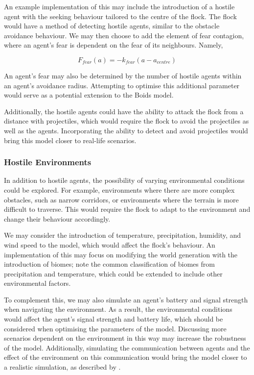 \documentclass[12pt]{article}
\begin{document}
An example implementation of this may include the introduction of a hostile agent with the seeking behaviour tailored to the centre of the flock. The flock would have a method of detecting hostile agents, similar to the obstacle avoidance behaviour. We may then choose to add the element of fear contagion, where an agent's fear is dependent on the fear of its neighbours. Namely,

\begin{equation}
    F_{fear}(a) = -k_{fear}(a-a_{centre})
\end{equation}

An agent's fear may also be determined by the number of hostile agents within an agent's avoidance radius. Attempting to optimise this additional parameter would serve as a potential extension to the Boids model.

Additionally, the hostile agents could have the ability to attack the flock from a distance with projectiles, which would require the flock to avoid the projectiles as well as the agents. Incorporating the ability to detect and avoid projectiles would bring this model closer to real-life scenarios.


\subsubsection{Hostile Environments}
In addition to hostile agents, the possibility of varying environmental conditions could be explored. For example, environments where there are more complex obstacles, such as narrow corridors, or environments where the terrain is more difficult to traverse. This would require the flock to adapt to the environment and change their behaviour accordingly. 

We may consider the introduction of temperature, precipitation, humidity, and wind speed to the model, which would affect the flock's behaviour.  An implementation of this may focus on modifying the world generation with the introduction of biomes; \citet{jiang2017biome,whittaker1970communities} note the common classification of biomes from precipitation and temperature, which could be extended to include other environmental factors.

To complement this, we may also simulate an agent's battery and signal strength when navigating the environment. As a result, the environmental conditions would affect the agent's signal strength and battery life, which should be considered when optimising the parameters of the model. Discussing more scenarios dependent on the environment in this way may increase the robustness of the model. Additionally, simulating the communication between agents and the effect of the environment on this communication would bring the model closer to a realistic simulation, as described by \citet{Zhou}.
\end{document}

